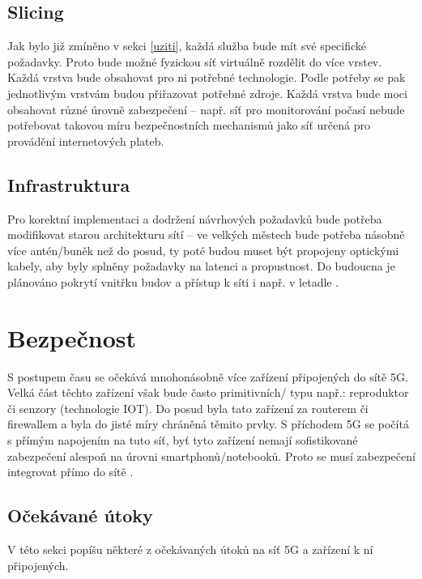\section{Slicing}
Jak bylo již zmíněno v sekci  \ref{uziti}, každá služba bude mít své specifické požadavky. Proto bude možné fyzickou síť virtuálně rozdělit do více vrstev. Každá vrstva bude obsahovat pro ni potřebné technologie. Podle potřeby se pak jednotlivým vrstvám budou přiřazovat potřebné zdroje. Každá vrstva bude moci obsahovat různé úrovně zabezpečení \cite{Slicing} -- např. síť pro monitorování počasí nebude potřebovat takovou míru bezpečnostních mechanismů jako síť určená pro provádění internetových plateb. 
\section{Infrastruktura}
Pro korektní implementaci a dodržení návrhových požadavků bude potřeba modifikovat starou architekturu sítí -- ve velkých městech bude potřeba násobně více antén/buněk než do posud, ty poté budou muset být propojeny optickými kabely, aby byly splněny požadavky na latenci a propustnost. Do budoucna je plánováno pokrytí vnitřku budov a přístup k síti i např. v letadle \cite{Cetin}.
\par


\chapter{Bezpečnost}
S postupem času se očekává mnohonásobně více zařízení připojených do sítě 5G. Velká část těchto zařízení však bude často primitivních/ typu např.: reproduktor či senzory (technologie IOT).  Do posud byla tato zařízení  za routerem či firewallem a byla do jisté míry chráněná těmito prvky. S příchodem 5G se počítá s přímým napojením na tuto síť, byť tyto zařízení nemají sofistikované zabezpečení alespoň na úrovni smartphonů/notebooků. Proto se musí zabezpečení integrovat přímo do sítě \cite{Avast}.
\section{Očekávané útoky}
V této sekci popíšu některé z očekávaných útoků na síť 5G a zařízení k ní připojených.
